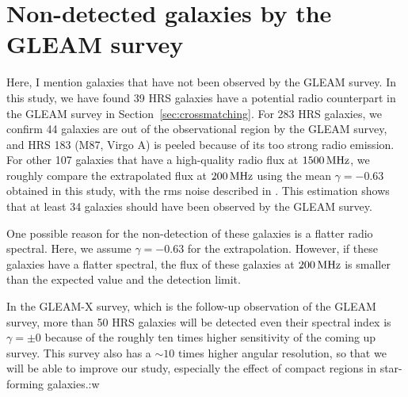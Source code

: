 \section{Non-detected galaxies by the GLEAM survey}\label{sec:nondetectedgalaxiesbythegleamsurvey}

Here, I mention galaxies that have not been observed by the GLEAM survey.
In this study, we have found 39 HRS galaxies have a potential radio counterpart in the GLEAM survey in Section~\ref{sec:crossmatching}.
For 283 HRS galaxies, we confirm 44 galaxies are out of the observational region by the GLEAM survey, and HRS 183 (M87, Virgo A) is peeled because of its too strong radio emission.
For other 107 galaxies that have a high-quality radio flux at $1500\,\mathrm{MHz}$, we roughly compare the extrapolated flux at $200\,\mathrm{MHz}$ using the mean $\gamma = -0.63$ obtained in this study, with the rms noise described in \citet{Hurley-Walker2017a}.
This estimation shows that at least 34 galaxies should have been observed by the GLEAM survey.

One possible reason for the non-detection of these galaxies is a flatter radio spectral.
Here, we assume $\gamma = -0.63$ for the extrapolation.
However, if these galaxies have a flatter spectral, the flux of these galaxies at $200\,\mathrm{MHz}$ is smaller than the expected value and the detection limit.

In the GLEAM-X survey, which is the follow-up observation of the GLEAM survey, more than 50 HRS galaxies will be detected even their spectral index is $\gamma = \pm 0$ because of the roughly ten times higher sensitivity of the coming up survey.
This survey also has a $\sim 10$ times higher angular resolution, so that we will be able to improve our study, especially the effect of compact regions in star-forming galaxies.:w




%
%
